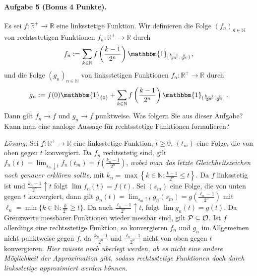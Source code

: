 \documentclass{article}
\begin{document}
\paragraph{Aufgabe 5 \textnormal{(Bonus 4 Punkte)}.}
Es sei $f\colon\mathbb{R}^+\to\mathbb{R}$ eine linksstetige Funktion.
Wir definieren die Folge $(f_n)_{n\in\mathbb{N}}$ von rechtsstetigen Funktionen $f_n\colon\mathbb{R}^+\to\mathbb{R}$ durch
\[
f_n:=\sum_{k\in\mathbb{N}}f\left(\frac{k-1}{2^n}\right)\mathbbm{1}_{[\frac{k-1}{2^n},\frac{k}{2^n})}\,,
\]
und  die Folge $(g_n)_{n\in\mathbb{N}}$ von linksstetigen Funktionen $f_n\colon\mathbb{R}^+\to\mathbb{R}$ durch
\[
g_n:=f(0)\mathbbm{1}_{\{0\}}+\sum_{k\in\mathbb{N}}f\left(\frac{k-1}{2^n}\right)\mathbbm{1}_{(\frac{k-1}{2^n},\frac{k}{2^n}]}\,.
\]
Dann gilt $f_n\to f$ und $g_n\to f$ punktweise.
Was folgern Sie aus dieser Aufgabe?
Kann man eine analoge Aussage für rechtsstetige Funktionen formulieren?

\noindent\emph{Lösung:} Sei $f\colon \mathbb{R}^+\to\mathbb{R}$ eine linksstetige Funktion, $t\geq0$, $(t_m)$ eine Folge, die von oben gegen $t$ konvergiert.
Da $f_n$ rechtsstetig sind, gilt $f_n(t)=\lim_{s_m\downarrow t}f_n(t_m)=f\left(\frac{k_n-1}{2^n}\right)$,
\emph{wobei man das letzte Gleichheitszeichen noch genauer erklären sollte,}
mit $k_n=\max\left\{k\in\mathbb{N}:\frac{k-1}{2^n}\leq t\right\}$.
Da $f$ linksstetig ist und $\frac{k_n-1}{2^n}\uparrow t$ folgt $\lim f_n(t)=f(t)$.
Sei $(s_m)$ eine Folge, die von unten gegen $t$ konvergiert, dann gilt $g_n(t)=\lim_{s_m\uparrow t}g_n(s_m)=g(\frac{\ell_n-1}{2^n})$ mit $\ell_n=\min\{k\in\mathbb{N}:\frac{k}{2^n}\geq t\}$.
Da auch $\frac{\ell_n-1}{2^n}\uparrow t$, folgt $\lim g_n(t)=g(t)$.
Da Grenzwerte messbarer Funktionen wieder messbar sind, gilt ${\cal P}\subseteq{\cal O}$.
Ist $f$ allerdings eine rechtsstetige Funktion, so konvergieren $f_n$ und $g_n$ im Allgemeinen nicht punktweise gegen $f$, da $\frac{k_n-1}{2^n}$ und $\frac{\ell_n-1}{2^n}$ nicht von oben gegen $t$ konvergieren. \emph{Hier müsste noch überlegt werden, ob es nicht eine andere Möglichkeit der Approximation gibt, sodass rechtsstetige Funktionen doch durch linksstetige approximiert werden können.}

\end{document}
